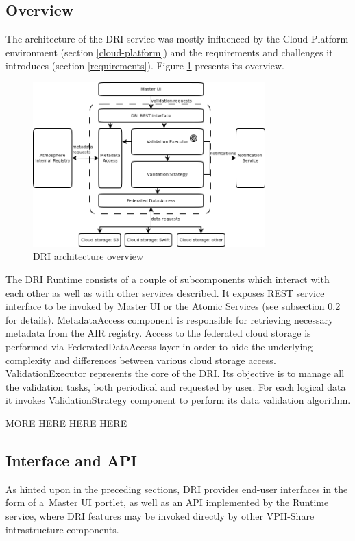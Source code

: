 \subsection{Overview}
The architecture of the DRI service was mostly influenced by the Cloud Platform
environment (section \ref{cloud-platform}) and the requirements and challenges
it introduces (section \ref{requirements}). Figure \ref{fig:dri-architecture}
presents its overview.\\

\begin{figure}[h!]
	\centering
	\includegraphics[width=0.8\textwidth]{images/dri-architecture.png}
	\caption{DRI architecture overview}
	\label{fig:dri-architecture}
\end{figure}

The DRI Runtime consists of a couple of subcomponents which interact with each
other as well as with other services described. It exposes REST service
interface to be invoked by Master UI or the Atomic Services (see subsection
\ref{dri-interface} for details). MetadataAccess component is responsible for
retrieving necessary metadata from the AIR registry. Access to the federated
cloud storage is performed via FederatedDataAccess layer in order to hide
the underlying complexity and differences between various cloud storage access.
ValidationExecutor represents the core of the DRI. Its objective is to manage
all the validation tasks, both periodical and requested by user. For
each logical data it invokes ValidationStrategy component to perform
its data validation algorithm.

MORE HERE HERE HERE

\subsection{Interface and API}
\label{dri-interface}
As hinted upon in the preceding sections, DRI provides end-user interfaces
in the form of a~Master UI portlet, as well as an API implemented by the
Runtime service, where DRI features may be invoked directly by other VPH-Share
intrastructure components.\\

